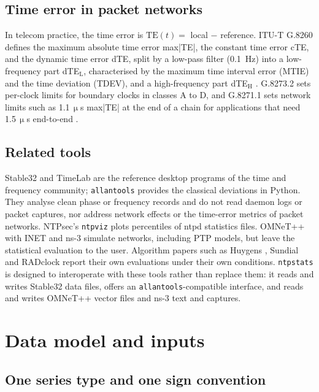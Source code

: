 \documentclass[11pt,a4paper]{article}
\newcommand{\ntp}{\texttt{ntpstats}}
\newcommand{\micro}{\ensuremath{\upmu}}
\newcommand{\us}{\,\micro s}
\begin{document}
\subsection{Time error in packet networks}

In telecom practice, the time error is $\mathrm{TE}(t) = $ local $-$ reference. ITU-T G.8260 defines
the maximum absolute time error max|TE|, the constant time error cTE, and the dynamic time error dTE,
split by a low-pass filter (0.1~Hz) into a low-frequency part dTE$_\mathrm{L}$, characterised by the
maximum time interval error (MTIE) and the time deviation (TDEV), and a high-frequency part dTE$_\mathrm{H}$
\citep{g8260}. G.8273.2 sets per-clock limits for boundary clocks in classes A to D, and G.8271.1 sets
network limits such as 1.1\us{} max|TE| at the end of a chain for applications that need 1.5\us{}
end-to-end \citep{g8273_2,g8271_1}.

\subsection{Related tools}\label{sec:related}

Stable32 \citep{stable32} and TimeLab \citep{timelab} are the reference desktop programs of the time and
frequency community; \texttt{allantools} \citep{allantools} provides the classical deviations in Python.
They analyse clean phase or frequency records and do not read daemon logs or packet captures, nor
address network effects or the time-error metrics of packet networks. NTPsec's \texttt{ntpviz}
\citep{ntpviz} plots percentiles of ntpd statistics files. OMNeT++ with INET \citep{omnetpp,inet} and
ns-3 \citep{ns3} simulate networks, including PTP models, but leave the statistical evaluation to the
user. Algorithm papers such as Huygens \citep{geng2018}, Sundial \citep{li2020sundial} and RADclock
\citep{veitch2009} report their own evaluations under their own conditions. \ntp{} is designed to
interoperate with these tools rather than replace them: it reads and writes Stable32 data files, offers
an \texttt{allantools}-compatible interface, and reads and writes OMNeT++ vector files and ns-3 text and
captures.

\section{Data model and inputs}\label{sec:data}

\subsection{One series type and one sign convention}
\end{document}
